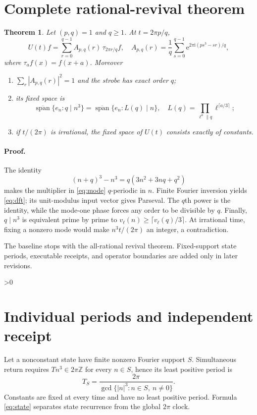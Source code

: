 \documentclass[10pt]{article}
\newtheorem{theorem}{Theorem}
\newcommand{\Z}{\mathbb Z}
\newcommand{\ee}{\mathrm e}
\newcommand{\ii}{\mathrm i}
\begin{document}
\section{Complete rational-revival theorem}
\begin{theorem}\label{thm:revival}
Let $(p,q)=1$ and $q\ge1$.  At $t=2\pi p/q$,
\begin{equation}
 U(t)f=\sum_{r=0}^{q-1}A_{p,q}(r)\,
 \tau_{2\pi r/q}f,
 \quad
 A_{p,q}(r)=\frac1q\sum_{s=0}^{q-1}
 \ee^{2\pi\ii(ps^3-sr)/q},                              \label{eq:dft}
\end{equation}
where $\tau_a f(x)=f(x+a)$.  Moreover
\begin{enumerate}
\item $\sum_r|A_{p,q}(r)|^2=1$ and the strobe has exact order $q$;
\item its fixed space is
\[
 \overline{\operatorname{span}}\{e_n:q\mid n^3\}
 =\overline{\operatorname{span}}\{e_n:L(q)\mid n\},
 \quad L(q)=\prod_{\ell^a\parallel q}\ell^{\lceil a/3\rceil};
\]
\item if $t/(2\pi)$ is irrational, the fixed space of $U(t)$ consists
exactly of constants.
\end{enumerate}
\end{theorem}

\paragraph{Proof.}
The identity
\[
 (n+q)^3-n^3=q(3n^2+3nq+q^2)
\]
makes the multiplier in \eqref{eq:mode} $q$-periodic in $n$.  Finite Fourier
inversion yields \eqref{eq:dft}; its unit-modulus input vector gives Parseval.
The $q$th power is the identity, while the mode-one phase forces any order
to be divisible by $q$.  Finally, $q\mid n^3$ is equivalent prime by prime to
$v_\ell(n)\ge\lceil v_\ell(q)/3\rceil$.  At irrational time, fixing a
nonzero mode would make $n^3t/(2\pi)$ an integer, a contradiction.

\ifnum{}
The baseline stops with the all-rational revival theorem.  Fixed-support
state periods, executable receipts, and operator boundaries are added only
in later revisions.
\fi

\ifnum\CRevisionRound>0
\section{Individual periods and independent receipt}
Let a nonconstant state have finite nonzero Fourier support $S$.  Simultaneous
return requires $Tn^3\in2\pi\Z$ for every $n\in S$, hence its least positive
period is
\begin{equation}
 T_S=\frac{2\pi}{\gcd\{|n|^3:n\in S,\ n\ne0\}}.          \label{eq:state}
\end{equation}
Constants are fixed at every time and have no least positive period.  Formula
\eqref{eq:state} separates state recurrence from the global $2\pi$ clock.
\end{document}
